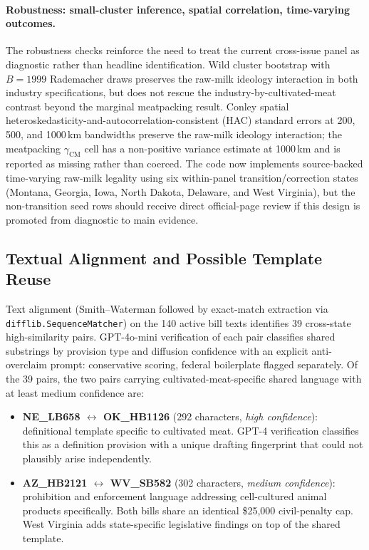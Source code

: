 \documentclass[12pt]{article}
\begin{document}
\paragraph{Robustness: small-cluster inference, spatial correlation, time-varying outcomes.}  The robustness checks reinforce the need to treat the current cross-issue panel as diagnostic rather than headline identification.  Wild cluster bootstrap with $B = 1999$ Rademacher draws preserves the raw-milk ideology interaction in both industry specifications, but does not rescue the industry-by-cultivated-meat contrast beyond the marginal meatpacking result.  Conley spatial heteroskedasticity-and-autocorrelation-consistent (HAC) standard errors at 200, 500, and 1000\,km bandwidths preserve the raw-milk ideology interaction; the meatpacking $\gamma_{\mathrm{CM}}$ cell has a non-positive variance estimate at 1000\,km and is reported as missing rather than coerced.  The code now implements source-backed time-varying raw-milk legality using six within-panel transition/correction states (Montana, Georgia, Iowa, North Dakota, Delaware, and West Virginia), but the non-transition seed rows should receive direct official-page review if this design is promoted from diagnostic to main evidence.

\subsection{Textual Alignment and Possible Template Reuse}
\label{sec:results_alignment}

Text alignment (Smith--Waterman followed by exact-match extraction via \texttt{difflib.\allowbreak SequenceMatcher}) on the 140 active bill texts identifies 39 cross-state high-similarity pairs.  GPT-4o-mini verification of each pair classifies shared substrings by provision type and diffusion confidence with an explicit anti-overclaim prompt: conservative scoring, federal boilerplate flagged separately.  Of the 39 pairs, the two pairs carrying cultivated-meat-specific shared language with at least medium confidence are:

\begin{itemize}
    \item \textbf{NE\_LB658 $\leftrightarrow$ OK\_HB1126} (292 characters, \emph{high confidence}): definitional template specific to cultivated meat.  GPT-4 verification classifies this as a definition provision with a unique drafting fingerprint that could not plausibly arise independently.
    \item \textbf{AZ\_HB2121 $\leftrightarrow$ WV\_SB582} (302 characters, \emph{medium confidence}): prohibition and enforcement language addressing cell-cultured animal products specifically.  Both bills share an identical \$25,000 civil-penalty cap.  West Virginia adds state-specific legislative findings on top of the shared template.
\end{itemize}
\end{document}
